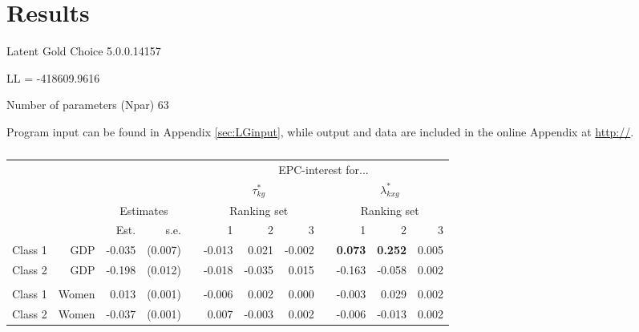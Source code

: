 \documentclass[letterpaper,12pt]{article}
\begin{document}
\section{Results}

Latent Gold Choice 5.0.0.14157
\citep{vermunt2005lgchoice,vermunt2013technical}

LL = -418609.9616

Number of parameters (Npar)	63

Program input can be found in Appendix \ref{sec:LGinput}, while output and data are included in the online Appendix at \url{http://}.

\begin{table}
	\begin{tabular}{lrrrrrrrrrrr}
	\hline
		&&&&&\multicolumn{7}{c}{EPC-interest for...}\\
	&&&&&\multicolumn{3}{c}{$\tau^{*}_{k g}$} && \multicolumn{3}{c}{$\lambda^{*}_{k x g}$}\\
			\hline
		&&\multicolumn{2}{c}{Estimates}&&\multicolumn{3}{c}{Ranking set} && \multicolumn{3}{c}{Ranking set}\\
\cline{3-4}\cline{6-8}\cline{10-12}
			&	&	Est.&	s.e.&	&	1  &	2  &	3  &&	  1&	2 &	3\\
				\hline
Class	1&	GDP&	-0.035&	(0.007)&	&	-0.013&	0.021&	-0.002&&	\textbf{0.073}&	\textbf{0.252}&	0.005\\
Class	2&	GDP&	-0.198&	(0.012)&	&	-0.018&	-0.035&	0.015&&	-0.163&	-0.058&	0.002\\
\\
Class	1&	Women&	0.013&	(0.001)&	&	-0.006&	0.002&	0.000&&	-0.003&	0.029&	0.002\\
Class	2&	Women&	-0.037&	(0.001)&	&	0.007&	-0.003&	0.002&&	-0.006&	-0.013&	0.002\\
	\hline
\end{tabular}
	\caption{\label{tab:epc-interest-model1}}
\end{table}
\end{document}

